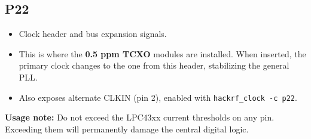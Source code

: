 \documentclass[11pt]{article}
\begin{document}
\subsection*{P22}
\begin{itemize}
    \item Clock header and bus expansion signals.
    \item This is where the \textbf{0.5 ppm TCXO} modules are installed. When inserted, the primary clock changes to the one from this header, stabilizing the general PLL.
    \item Also exposes alternate CLKIN (pin 2), enabled with \texttt{hackrf\_clock -c p22}.
\end{itemize}

\textbf{Usage note:} Do not exceed the LPC43xx current thresholds on any pin. Exceeding them will permanently damage the central digital logic.
\end{document}
